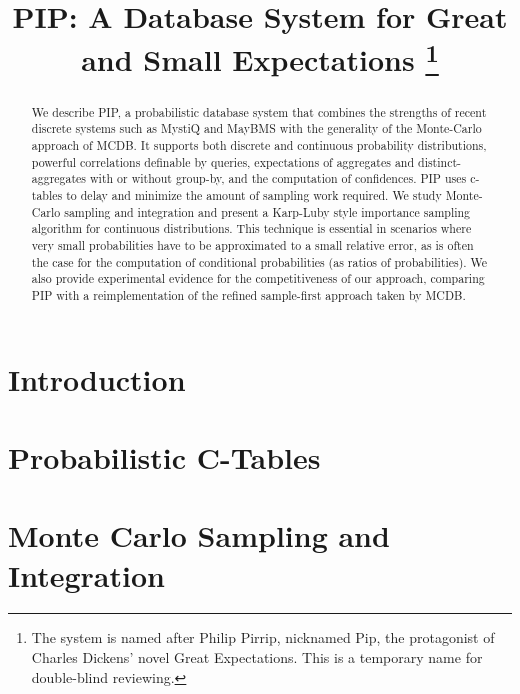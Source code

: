 \documentclass{sig-alternate}
\title{PIP: A Database System for Great and Small Expectations%
\thanks{The
system is named after Philip Pirrip, nicknamed Pip, the protagonist of
Charles Dickens' novel Great Expectations. This is a temporary name for
double-blind reviewing.}}
\date{}
\begin{document}



\toappear{}


\maketitle



\begin{abstract}
We describe PIP, a probabilistic database system
that combines the strengths of
recent discrete systems such as MystiQ and MayBMS with the generality of
the Monte-Carlo approach of MCDB. It supports both discrete and
continuous probability distributions, powerful correlations definable
by queries, expectations of aggregates and distinct-aggregates with or
without  group-by,  and the computation of confidences.
%
PIP uses c-tables to delay and minimize the amount of sampling work required.
We study Monte-Carlo sampling and integration and
present a Karp-Luby style importance
sampling algorithm for continuous distributions.
This technique is essential
in scenarios where very small probabilities have to be approximated to a small
relative error, as is often the case for the computation of conditional
probabilities (as ratios of probabilities).
%
We also provide experimental evidence for the competitiveness
of our approach, comparing PIP with a reimplementation of the
refined sample-first approach taken by MCDB. 
\end{abstract}



\section{Introduction}
\label{sec:introduction}


\section{Probabilistic C-Tables}
\label{sec:background}


\section{Monte Carlo Sampling and Integration}
\label{sec:sampling}

\end{document}
